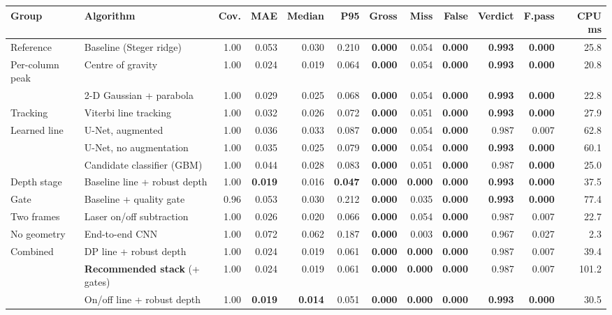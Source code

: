 \begin{tabular}{@{}llrrrrrrrrrr@{}}
\toprule
Group & Algorithm & Cov. & MAE & Median & P95 & Gross & Miss & False & Verdict & F.pass & CPU ms \\
\midrule
Reference & Baseline (Steger ridge) & 1.00 & 0.053 & 0.030 & 0.210 & \textbf{0.000} & 0.054 & \textbf{0.000} & \textbf{0.993} & \textbf{0.000} & 25.8 \\
\addlinespace[2pt]
Per-column peak & Centre of gravity & 1.00 & 0.024 & 0.019 & 0.064 & \textbf{0.000} & 0.054 & \textbf{0.000} & \textbf{0.993} & \textbf{0.000} & 20.8 \\
 & 2-D Gaussian + parabola & 1.00 & 0.029 & 0.025 & 0.068 & \textbf{0.000} & 0.054 & \textbf{0.000} & \textbf{0.993} & \textbf{0.000} & 22.8 \\
\addlinespace[2pt]
Tracking & Viterbi line tracking & 1.00 & 0.032 & 0.026 & 0.072 & \textbf{0.000} & 0.051 & \textbf{0.000} & \textbf{0.993} & \textbf{0.000} & 27.9 \\
\addlinespace[2pt]
Learned line & U-Net, augmented & 1.00 & 0.036 & 0.033 & 0.087 & \textbf{0.000} & 0.054 & \textbf{0.000} & 0.987 & 0.007 & 62.8 \\
 & U-Net, no augmentation & 1.00 & 0.035 & 0.025 & 0.079 & \textbf{0.000} & 0.054 & \textbf{0.000} & \textbf{0.993} & \textbf{0.000} & 60.1 \\
 & Candidate classifier (GBM) & 1.00 & 0.044 & 0.028 & 0.083 & \textbf{0.000} & 0.051 & \textbf{0.000} & 0.987 & \textbf{0.000} & 25.0 \\
\addlinespace[2pt]
Depth stage & Baseline line + robust depth & 1.00 & \textbf{0.019} & 0.016 & \textbf{0.047} & \textbf{0.000} & \textbf{0.000} & \textbf{0.000} & \textbf{0.993} & \textbf{0.000} & 37.5 \\
\addlinespace[2pt]
Gate & Baseline + quality gate & 0.96 & 0.053 & 0.030 & 0.212 & \textbf{0.000} & 0.035 & \textbf{0.000} & \textbf{0.993} & \textbf{0.000} & 77.4 \\
\addlinespace[2pt]
Two frames & Laser on/off subtraction & 1.00 & 0.026 & 0.020 & 0.066 & \textbf{0.000} & 0.054 & \textbf{0.000} & 0.987 & 0.007 & 22.7 \\
\addlinespace[2pt]
No geometry & End-to-end CNN & 1.00 & 0.072 & 0.062 & 0.187 & \textbf{0.000} & 0.003 & \textbf{0.000} & 0.967 & 0.027 & 2.3 \\
\addlinespace[2pt]
Combined & DP line + robust depth & 1.00 & 0.024 & 0.019 & 0.061 & \textbf{0.000} & \textbf{0.000} & \textbf{0.000} & 0.987 & 0.007 & 39.4 \\
 & \textbf{Recommended stack} (+ gates) & 1.00 & 0.024 & 0.019 & 0.061 & \textbf{0.000} & \textbf{0.000} & \textbf{0.000} & 0.987 & 0.007 & 101.2 \\
 & On/off line + robust depth & 1.00 & \textbf{0.019} & \textbf{0.014} & 0.051 & \textbf{0.000} & \textbf{0.000} & \textbf{0.000} & \textbf{0.993} & \textbf{0.000} & 30.5 \\
\bottomrule
\end{tabular}
